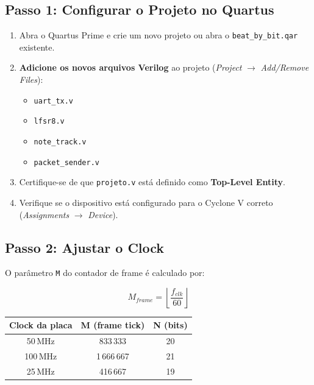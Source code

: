 \documentclass[12pt,a4paper]{article}
\begin{document}
\subsection{Passo 1: Configurar o Projeto no Quartus}

\begin{enumerate}
    \item Abra o Quartus Prime e crie um novo projeto ou abra o \texttt{beat\_by\_bit.qar} existente.
    \item \textbf{Adicione os novos arquivos Verilog} ao projeto (\textit{Project} $\rightarrow$ \textit{Add/Remove Files}):
    \begin{itemize}
        \item \texttt{uart\_tx.v}
        \item \texttt{lfsr8.v}
        \item \texttt{note\_track.v}
        \item \texttt{packet\_sender.v}
    \end{itemize}
    \item Certifique-se de que \texttt{projeto.v} está definido como \textbf{Top-Level Entity}.
    \item Verifique se o dispositivo está configurado para o Cyclone V correto (\textit{Assignments} $\rightarrow$ \textit{Device}).
\end{enumerate}

\subsection{Passo 2: Ajustar o Clock}

O parâmetro \texttt{M} do contador de frame é calculado por:

\begin{equation}
    M_{\mathit{frame}} = \left\lfloor \frac{f_{clk}}{60} \right\rfloor
\end{equation}

\begin{center}
\begin{tabular}{ccc}
\toprule
\textbf{Clock da placa} & \textbf{M (frame tick)} & \textbf{N (bits)} \\
\midrule
50\,MHz  & 833\,333 & 20 \\
100\,MHz & 1\,666\,667 & 21 \\
25\,MHz  & 416\,667  & 19 \\
\bottomrule
\end{tabular}
\end{center}
\end{document}
